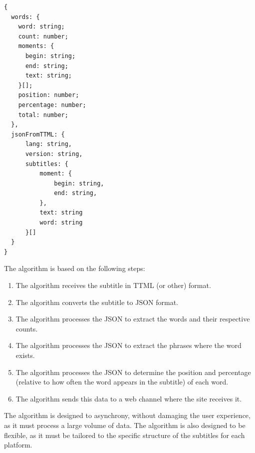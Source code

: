 \documentclass[12pt]{article}
\begin{document}
\begin{verbatim}
{
  words: {    
    word: string;
    count: number;
    moments: {
      begin: string;
      end: string;
      text: string;
    }[];
    position: number;
    percentage: number;
    total: number;
  },
  jsonFromTTML: {
      lang: string,
      version: string,
      subtitles: {
          moment: {
              begin: string,
              end: string,
          },
          text: string
          word: string
      }[]
  }
}
\end{verbatim}
The algorithm is based on the following steps:
\begin{enumerate}
  \item The algorithm receives the subtitle in TTML (or other) format.
  \item The algorithm converts the subtitle to JSON format.
  \item The algorithm processes the JSON to extract the words and their respective counts.
  \item The algorithm processes the JSON to extract the phrases where the word exists.
  \item The algorithm processes the JSON to determine the position and percentage (relative to how often the word appears in the subtitle) of each word.
  \item The algorithm sends this data to a web channel where the site receives it.
  \end{enumerate}
The algorithm is designed to asynchrony, without damaging the user experience, as it must process a large volume of data. The algorithm is also designed to be flexible, as it must be tailored to the specific structure of the subtitles for each platform. \\
\end{document}
